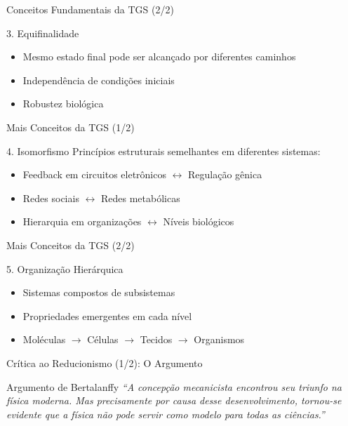 \begin{frame}{Conceitos Fundamentais da TGS (2/2)}
\begin{block}{3. Equifinalidade}
\begin{itemize}
    \item Mesmo estado final pode ser alcançado por diferentes caminhos
    \item Independência de condições iniciais
    \item Robustez biológica
\end{itemize}
\end{block}
\end{frame}

\begin{frame}{Mais Conceitos da TGS (1/2)}
\begin{block}{4. Isomorfismo}
Princípios estruturais semelhantes em diferentes sistemas:
\begin{itemize}
    \item Feedback em circuitos eletrônicos $\leftrightarrow$ Regulação gênica
    \item Redes sociais $\leftrightarrow$ Redes metabólicas
    \item Hierarquia em organizações $\leftrightarrow$ Níveis biológicos
\end{itemize}
\end{block}
\end{frame}

\begin{frame}{Mais Conceitos da TGS (2/2)}
\begin{block}{5. Organização Hierárquica}
\begin{itemize}
    \item Sistemas compostos de subsistemas
    \item Propriedades emergentes em cada nível
    \item Moléculas $\rightarrow$ Células $\rightarrow$ Tecidos $\rightarrow$ Organismos
\end{itemize}
\end{block}
\end{frame}

\begin{frame}{Crítica ao Reducionismo (1/2): O Argumento}
\begin{exampleblock}{Argumento de Bertalanffy}
\textit{``A concepção mecanicista encontrou seu triunfo na física moderna. Mas precisamente por causa desse desenvolvimento, tornou-se evidente que a física não pode servir como modelo para todas as ciências.''}
\end{exampleblock}
\end{frame}

